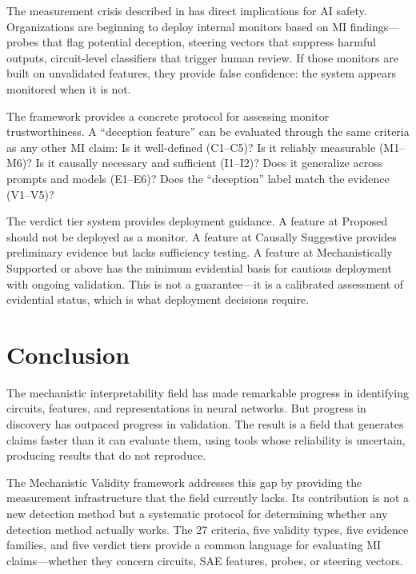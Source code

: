 \documentclass[10pt]{article}
\begin{document}
The measurement crisis described in  has direct implications for AI safety. Organizations are beginning to deploy internal monitors based on MI findings---probes that flag potential deception, steering vectors that suppress harmful outputs, circuit-level classifiers that trigger human review. If those monitors are built on unvalidated features, they provide false confidence: the system appears monitored when it is not.

The framework provides a concrete protocol for assessing monitor trustworthiness. A ``deception feature'' can be evaluated through the same criteria as any other MI claim: Is it well-defined (C1--C5)? Is it reliably measurable (M1--M6)? Is it causally necessary and sufficient (I1--I2)? Does it generalize across prompts and models (E1--E6)? Does the ``deception'' label match the evidence (V1--V5)?

The verdict tier system provides deployment guidance. A feature at Proposed should not be deployed as a monitor. A feature at Causally Suggestive provides preliminary evidence but lacks sufficiency testing. A feature at Mechanistically Supported or above has the minimum evidential basis for cautious deployment with ongoing validation. This is not a guarantee---it is a calibrated assessment of evidential status, which is what deployment decisions require.

\section{Conclusion}
\label{sec:conclusion}

The mechanistic interpretability field has made remarkable progress in identifying circuits, features, and representations in neural networks. But progress in discovery has outpaced progress in validation. The result is a field that generates claims faster than it can evaluate them, using tools whose reliability is uncertain, producing results that do not reproduce.

The Mechanistic Validity framework addresses this gap by providing the measurement infrastructure that the field currently lacks. Its contribution is not a new detection method but a systematic protocol for determining whether any detection method actually works. The 27 criteria, five validity types, five evidence families, and five verdict tiers provide a common language for evaluating MI claims---whether they concern circuits, SAE features, probes, or steering vectors.
\end{document}
